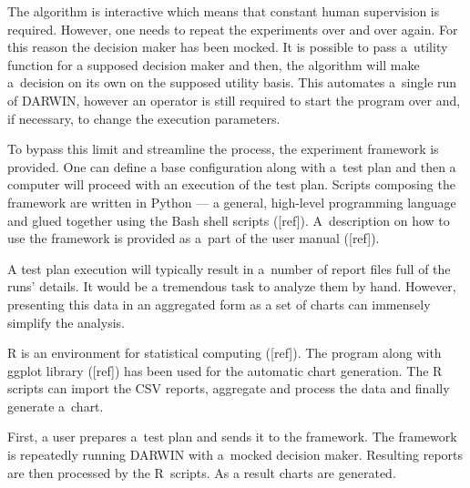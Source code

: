 The algorithm is interactive which means that constant human supervision is
required. However, one needs to repeat the experiments over and over
again. For this reason the decision maker has been mocked. It is possible to
pass a~utility function for a supposed decision maker and then, the algorithm
will make a~decision on its own on the supposed utility basis. This automates
a~single run of DARWIN, however an operator is still required to start the
program over and, if necessary, to change the execution parameters.

To bypass this limit and streamline the process, the experiment framework is
provided. One can define a base configuration along with a~test plan and then
a computer will proceed with an execution of the test plan. Scripts composing
the framework are written in Python --- a general, high-level programming
language and glued together using the Bash shell scripts
([ref]). A~description on how to use the framework is provided as a~part of
the user manual ([ref]).

A test plan execution will typically result in a~number of report files full
of the runs' details. It would be a tremendous task to analyze them by
hand. However, presenting this data in an aggregated form as a set of charts
can immensely simplify the analysis.

R is an environment for statistical computing ([ref]). The program along with
ggplot library ([ref]) has been used for the automatic chart generation. The R
scripts can import the CSV reports, aggregate and process the data and finally
generate a~chart.

First, a user prepares a~test plan and sends it to the framework. The
framework is repeatedly running DARWIN with a~mocked decision maker. Resulting
reports are then processed by the R~scripts. As a result charts are generated.

